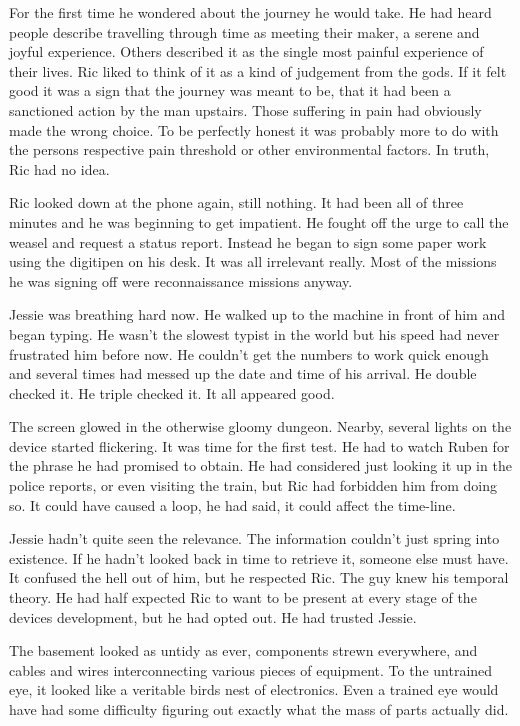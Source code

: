 For the first time he wondered about the journey he would take.  He had heard people describe travelling through time as meeting their maker, a serene and joyful experience.  Others described it as the single most painful experience of their lives.  Ric liked to think of it as a kind of judgement from the gods.  If it felt good it was a sign that the journey was meant to be, that it had been a sanctioned action by the man upstairs.  Those suffering in pain had obviously made the wrong choice.  To be perfectly honest it was probably more to do with the persons respective pain threshold or other environmental factors.  In truth, Ric had no idea.

Ric looked down at the phone again, still nothing.  It had been all of three minutes and he was beginning to get impatient.  He fought off the urge to call the weasel and request a status report.  Instead he began to sign some paper work using the digitipen on his desk.  It was all irrelevant really.  Most of the missions he was signing off were reconnaissance missions anyway. 



\thoughtbreak



Jessie was breathing hard now.  He walked up to the machine in front of him and began typing.  He wasn't the slowest typist in the world but his speed had never frustrated him before now.  He couldn't get the numbers to work quick enough and several times had messed up the date and time of his arrival.  He double checked it.  He triple checked it.  It all appeared good.  

The screen glowed in the otherwise gloomy dungeon.  Nearby, several lights on the device started flickering.  It was time for the first test.  He had to watch Ruben for the phrase he had promised to obtain.  He had considered just looking it up in the police reports, or even visiting the train, but Ric had forbidden him from doing so.  It could have caused a loop, he had said, it could affect the time-line.  

Jessie hadn't quite seen the relevance.  The information couldn't just spring into existence.  If he hadn't looked back in time to retrieve it, someone else must have.  It confused the hell out of him, but he respected Ric.  The guy knew his temporal theory.  He had half expected Ric to want to be present at every stage of the devices development, but he had opted out.  He had trusted Jessie.

The basement looked as untidy as ever, components strewn everywhere, and cables and wires interconnecting various pieces of equipment.  To the untrained eye, it looked like a veritable birds nest of electronics.  Even a trained eye would have had some difficulty figuring out exactly what the mass of parts actually did.  

